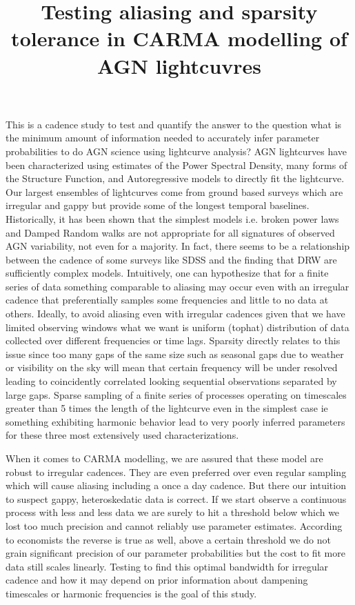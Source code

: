 \documentclass[]{article}
\title{Testing aliasing and sparsity tolerance in CARMA modelling of AGN lightcuvres}
\author{}
\begin{document}
\maketitle


This is a cadence study to test and quantify the answer to the question what is the minimum amount of information needed to accurately infer parameter probabilities to do AGN science using lightcurve analysis?  AGN lightcurves have been characterized using estimates of the Power Spectral Density, many forms of the Structure Function, and Autoregressive models to directly fit the lightcurve.  Our largest ensembles of lightcurves come from ground based surveys which are irregular and gappy but provide some of the longest temporal baselines.   Historically, it has been shown that the simplest models i.e. broken power laws and Damped Random walks are not appropriate for all signatures of observed AGN variability, not even for a majority.  In fact, there seems to be a relationship between the cadence of some surveys like SDSS and the finding that DRW are sufficiently complex models.  Intuitively, one can hypothesize that for a finite series of data something comparable to aliasing may occur even with an irregular cadence that preferentially samples some frequencies and little to no data at others.  Ideally, to avoid aliasing even with irregular cadences given that we have limited observing windows what we want is uniform (tophat) distribution of data collected over different frequencies or time lags.  Sparsity directly relates to this issue since too many gaps of the same size such as seasonal gaps due to weather or visibility on the sky will mean that certain frequency will be under resolved leading to coincidently correlated looking sequential observations separated by large gaps.  Sparse sampling of a finite series of processes operating on timescales greater than 5 times the length of the lightcurve even in the simplest case ie something exhibiting harmonic behavior lead to very poorly inferred parameters for these three most extensively used characterizations.  

When it comes to CARMA modelling, we are assured that these model are robust to irregular cadences. They are even preferred over even regular sampling which will cause aliasing including a once a day cadence.  But there our intuition to suspect gappy, heteroskedatic data is correct.  If we start observe a continuous process with less and less data we are surely to hit a threshold below which we lost too much precision and cannot reliably use parameter estimates.  According to economists the reverse is true as well, above a certain threshold we do not grain significant precision of our parameter probabilities but the cost to fit more data still scales linearly.  Testing to find this optimal bandwidth for irregular cadence and how it may depend on prior information about dampening timescales or harmonic frequencies  is the goal of this study.   
\end{document}
